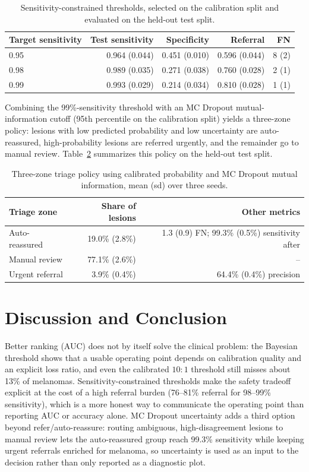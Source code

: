\documentclass[10pt,a4paper]{article}
\begin{document}
\begin{table}[htbp]
\centering
\caption{Sensitivity-constrained thresholds, selected on the calibration split and evaluated on the held-out test split.}
\label{tab:operating}
\small
\begin{tabular}{lrrrr}
\toprule
Target sensitivity & Test sensitivity & Specificity & Referral & FN \\
\midrule
0.95 & 0.964 (0.044) & 0.451 (0.010) & 0.596 (0.044) & 8 (2) \\
0.98 & 0.989 (0.035) & 0.271 (0.038) & 0.760 (0.028) & 2 (1) \\
0.99 & 0.993 (0.029) & 0.214 (0.034) & 0.810 (0.028) & 1 (1) \\
\bottomrule
\end{tabular}
\end{table}

Combining the 99\%-sensitivity threshold with an MC Dropout mutual-information cutoff (95th percentile on the calibration split) yields a three-zone policy: lesions with low predicted probability and low uncertainty are auto-reassured, high-probability lesions are referred urgently, and the remainder go to manual review. Table~\ref{tab:triage-zone} summarizes this policy on the held-out test split.

\begin{table}[htbp]
\centering
\caption{Three-zone triage policy using calibrated probability and MC Dropout mutual information, mean (sd) over three seeds.}
\label{tab:triage-zone}
\small
\begin{tabular}{lrr}
\toprule
Triage zone & Share of lesions & Other metrics \\
\midrule
Auto-reassured & 19.0\% (2.8\%) & 1.3 (0.9) FN; 99.3\% (0.5\%) sensitivity after \\
Manual review & 77.1\% (2.6\%) & -- \\
Urgent referral & 3.9\% (0.4\%) & 64.4\% (0.4\%) precision \\
\bottomrule
\end{tabular}
\end{table}

\section{Discussion and Conclusion}
Better ranking (AUC) does not by itself solve the clinical problem: the Bayesian threshold shows that a usable operating point depends on calibration quality and an explicit loss ratio, and even the calibrated $10{:}1$ threshold still misses about 13\% of melanomas. Sensitivity-constrained thresholds make the safety tradeoff explicit at the cost of a high referral burden (76--81\% referral for 98--99\% sensitivity), which is a more honest way to communicate the operating point than reporting AUC or accuracy alone. MC Dropout uncertainty adds a third option beyond refer/auto-reassure: routing ambiguous, high-disagreement lesions to manual review lets the auto-reassured group reach 99.3\% sensitivity while keeping urgent referrals enriched for melanoma, so uncertainty is used as an input to the decision rather than only reported as a diagnostic plot.
\end{document}
